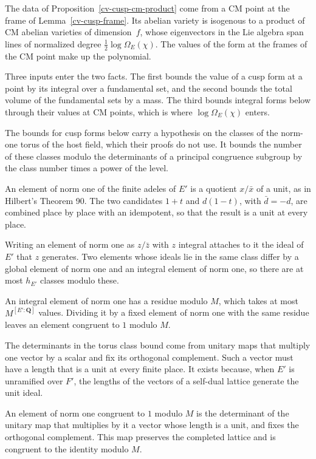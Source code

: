 The data of Proposition~\ref{cv-cusp-cm-product} come from a CM point at the frame of
Lemma~\ref{cv-cusp-frame}. Its abelian variety is isogenous to a product of CM abelian varieties of
dimension~$f$, whose eigenvectors in the Lie algebra span lines of normalized degree
$\frac12\log\Omega_E(\chi)$. The values of the form at the frames of the CM point make up the polynomial.

Three inputs enter the two facts. The first bounds the value of a cusp form at a point by its
integral over a fundamental set, and the second bounds the total volume of the fundamental sets by a
mass. The third bounds integral forms below through their values at CM points, which is where
$\log\Omega_E(\chi)$ enters.

The bounds for cusp forms below carry a hypothesis on the classes of the norm-one torus of the host
field, which their proofs do not use. It bounds the number of these classes modulo the determinants of
a principal congruence subgroup by the class number times a power of the level.

An element of norm one of the finite adeles of $E'$ is a quotient $x/\bar x$ of a unit, as in Hilbert's
Theorem 90. The two candidates $1+t$ and $d(1-t)$, with $\bar d=-d$, are combined place by place with an
idempotent, so that the result is a unit at every place.

Writing an element of norm one as $z/\bar z$ with $z$ integral attaches to it the ideal of $E'$ that $z$
generates. Two elements whose ideals lie in the same class differ by a global element of norm one and an
integral element of norm one, so there are at most $h_{E'}$ classes modulo these.

An integral element of norm one has a residue modulo $M$, which takes at most $M^{[E':\mathbf Q]}$ values.
Dividing it by a fixed element of norm one with the same residue leaves an element congruent to $1$ modulo
$M$.

The determinants in the torus class bound come from unitary maps that multiply one vector by a scalar and
fix its orthogonal complement. Such a vector must have a length that is a unit at every finite place. It
exists because, when $E'$ is unramified over $F'$, the lengths of the vectors of a self-dual lattice
generate the unit ideal.

An element of norm one congruent to $1$ modulo $M$ is the determinant of the unitary map that multiplies
by it a vector whose length is a unit, and fixes the orthogonal complement. This map preserves the completed
lattice and is congruent to the identity modulo $M$.

